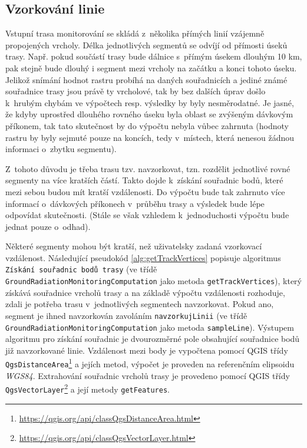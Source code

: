 \subsection{Vzorkování linie}
\label{subsec:vzorkovaniLinie} Vstupní trasa monitorování se skládá
z~několika přímých linií vzájemně propojených vrcholy. Délka
jednotlivých segmentů se odvíjí od přímosti úseků trasy. Např. pokud
součástí trasy bude dálnice s~přímým úsekem dlouhým 10 km, pak stejně
bude dlouhý i segment mezi vrcholy na začátku a konci tohoto
úseku. Jelikož snímání hodnot rastru probíhá na daných souřadnicích a
jediné známé souřadnice trasy jsou právě ty vrcholové, tak by bez
dalších úprav došlo k~hrubým chybám ve výpočtech resp. výsledky by
byly nesměrodatné. Je jasné, že kdyby uprostřed dlouhého rovného úseku
byla oblast se zvýšeným dávkovým příkonem, tak tato skutečnost by do
výpočtu nebyla vůbec zahrnuta (hodnoty rastru by byly sejmuté pouze na
koncích, tedy v~místech, která nenesou žádnou informaci o~zbytku
segmentu).

Z~tohoto důvodu je třeba trasu tzv. navzorkovat, tzn. rozdělit
jednotlivé rovné segmenty na více kratších částí. Takto dojde
k~získání souřadnic bodů, které mezi sebou budou mít kratší
vzdálenosti. Do výpočtu bude tak zahrnuto více informací o~dávkových
příkonech v~průběhu trasy a výsledek bude lépe odpovídat
skutečnosti. (Stále se však vzhledem k~jednoduchosti výpočtu bude
jednat pouze o~odhad).

Některé segmenty mohou být kratší, než uživatelsky zadaná vzorkovací
vzdálenost. Následující pseudokód
\ref{alg:getTrackVertices} popisuje algoritmus \texttt{Získání
souřadnic bodů trasy} (ve třídě
\texttt{GroundRadiationMonitoringComputation} jako metoda
\texttt{getTrackVertices}), který získává souřadnice vrcholů trasy a
na základě výpočtu vzdálenosti rozhoduje, zdali je potřeba trasu
v~jednotlivých segmentech navzorkovat. Pokud ano, segment je ihned
navzorkován zavoláním \texttt{navzorkujLinii} (ve třídě \\
\texttt{GroundRadiationMonitoringComputation} jako metoda
\texttt{sampleLine}). Výstupem algoritmu pro získání souřadnic je
dvourozměrné pole obsahující souřadnice bodů již navzorkované
linie. Vzdálenost mezi body je vypočtena pomocí QGIS třídy
\texttt{QgsDistanceArea}\footnote{\url{https://qgis.org/api/classQgsDistanceArea.html}}
a jejích metod, výpočet je proveden na referenčním elipsoidu
\textit{WGS84}. Extrahování souřadnic vrcholů trasy je provedeno
pomocí QGIS třídy
\texttt{QgsVectorLayer}\footnote{\url{https://qgis.org/api/classQgsVectorLayer.html}}
a její metody \texttt{getFeatures}.

